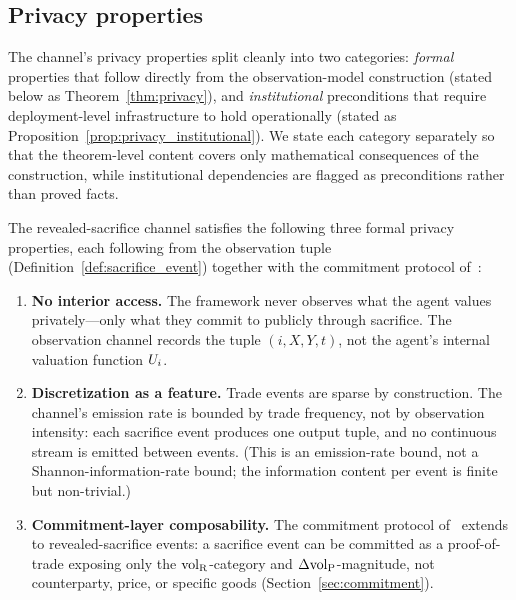 \subsection{Privacy properties}

The channel's privacy properties split cleanly into two
categories: \emph{formal} properties that follow directly from
the observation-model construction (stated below as
Theorem~\ref{thm:privacy}), and \emph{institutional}
preconditions that require deployment-level infrastructure to
hold operationally (stated as
Proposition~\ref{prop:privacy_institutional}).  We state each
category separately so that the theorem-level content covers
only mathematical consequences of the construction, while
institutional dependencies are flagged as preconditions rather
than proved facts.

\begin{theorem}
\label{thm:privacy}
The revealed-sacrifice channel satisfies the following three
formal privacy properties, each following from the observation
tuple (Definition~\ref{def:sacrifice_event}) together with the
commitment protocol
of~\citep[Definition~6]{lasser2026exo}:

\begin{enumerate}
\item[\textbf{(P1)}] \textbf{No interior access.}  The framework
  never observes what the agent values privately---only what they
  commit to publicly through sacrifice.  The observation channel
  records the tuple $(i, X, Y, t)$, not the agent's internal
  valuation function $U_i$.

\item[\textbf{(P3)}] \textbf{Discretization as a feature.}  Trade
  events are sparse by construction.  The channel's emission rate
  is bounded by trade frequency, not by observation intensity:
  each sacrifice event produces one output tuple, and no
  continuous stream is emitted between events.  (This is an
  emission-rate bound, not a Shannon-information-rate bound; the
  information content per event is finite but non-trivial.)

\item[\textbf{(P4)}] \textbf{Commitment-layer composability.}
  The commitment protocol
  of~\citep[Definition~6]{lasser2026exo} extends to
  revealed-sacrifice events: a sacrifice event can be committed as
  a proof-of-trade exposing only the ${\operatorname{vol}_{\mathrm{R}}}$-category and
  $\Delta{\operatorname{vol}_{\mathrm{P}}}$-magnitude, not counterparty, price, or specific
  goods (Section~\ref{sec:commitment}).
\end{enumerate}
\end{theorem}

